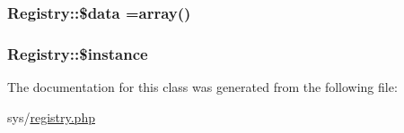 \subsubsection[{\$data}]{\setlength{\rightskip}{0pt plus 5cm}Registry\+::\$data =array()\hspace{0.3cm}{\ttfamily [private]}}\label{classRegistry_ae8d90c35c0124765b18728fbc3f1bf2c}
\hypertarget{classRegistry_aee4dbb24c575d446f5d91414e25fd1d1}{}
\subsubsection[{\$instance}]{\setlength{\rightskip}{0pt plus 5cm}Registry\+::\$instance\hspace{0.3cm}{\ttfamily [static]}}\label{classRegistry_aee4dbb24c575d446f5d91414e25fd1d1}


The documentation for this class was generated from the following file\+:\begin{DoxyCompactItemize}
\item 
sys/\hyperlink{registry_8php}{registry.\+php}\end{DoxyCompactItemize}
